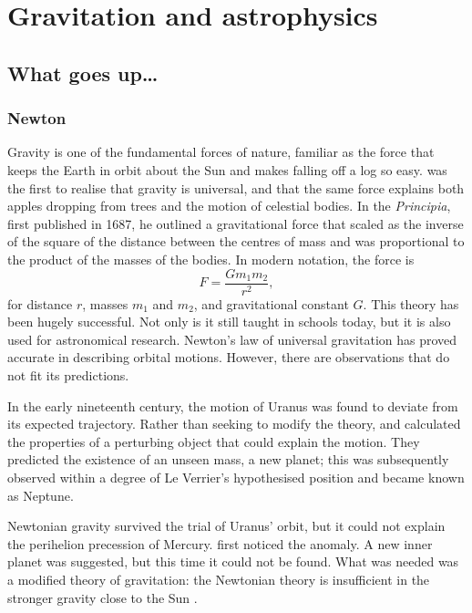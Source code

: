 \chapter{Gravitation and astrophysics}\label{ch:Let-there-be-gravity}

\section{What goes up\ldots}

\subsection{Newton}

Gravity is one of the fundamental forces of nature, familiar as the force that keeps the Earth in orbit about the Sun and makes falling off a log so easy. \citet[book 3]{Newton1999} was the first to realise that gravity is universal, and that the same force explains both apples dropping from trees and the motion of celestial bodies. In the \textit{Principia}, first published in 1687, he outlined a gravitational force that scaled as the inverse of the square of the distance between the centres of mass and was proportional to the product of the masses of the bodies. In modern notation, the force is
\begin{equation}
F = \dfrac{G m_1 m_2}{r^2},
\end{equation}
for distance $r$, masses $m_1$ and $m_2$, and gravitational constant $G$. This theory has been hugely successful. Not only is it still taught in schools today, but it is also used for astronomical research. Newton's law of universal gravitation has proved accurate in describing orbital motions. However, there are observations that do not fit its predictions.

In the early nineteenth century, the motion of Uranus was found to deviate from its expected trajectory. Rather than seeking to modify the theory, \citet[\textit{troisi{\`e}me partie}]{LeVerrier1846} and \citet[papers 1, 2]{Adams1896} calculated the properties of a perturbing object that could explain the motion. They predicted the existence of an unseen mass, a new planet; this was subsequently observed within a degree of Le Verrier's hypothesised position \citep[\textit{cinqui{\`e}me partie}]{LeVerrier1846} and became known as Neptune.

Newtonian gravity survived the trial of Uranus' orbit, but it could not explain the perihelion precession of Mercury. \citet[\textit{chapitre XV}, \textit{section quatri{\`e}me}]{LeVerrier1859} first noticed the anomaly. A new inner planet was suggested, but this time it could not be found. What was needed was a modified theory of gravitation: the Newtonian theory is insufficient in the stronger gravity close to the Sun \citep[document 24]{Einstein1997}.

